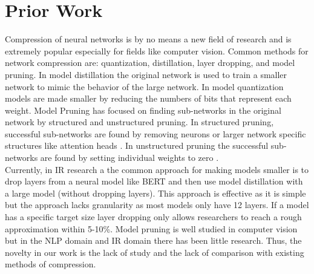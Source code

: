\documentclass[sigplan,screen]{acmart}
\begin{document}
\section{Prior Work}
Compression of neural networks is by no means a new field of research and is extremely popular especially for fields like computer vision. Common methods for network compression are: quantization, distillation, layer dropping, and model pruning. In model distillation \cite{Ba2014DoDN} the original network is used to train a smaller network to mimic the behavior of the large network. In model quantization \cite{Han2016DeepCC} models are made smaller by  reducing the numbers of bits that represent each weight. Model Pruning \cite{LeCun1989OptimalBD} has focused on finding sub-networks in the original network by structured and unstructured pruning. In structured pruning, successful sub-networks are found by removing neurons  \cite{Wang2019StructuredPF} or larger network specific structures like attention heads \cite{Voita2019AnalyzingMS}. In unstructured pruning the successful sub-networks are found by setting individual weights to zero \cite{Kwon2019StructuredCB}. \\
Currently, in IR research a the common approach for making models smaller is to drop layers from a neural model like BERT and then use model distillation with a large model (without dropping layers). This approach is effective as it is simple but the approach lacks granularity as most models only have 12 layers. If a model has a specific target size layer dropping only allows researchers to reach a rough approximation within 5-10\%. Model pruning is well studied in computer vision but in the NLP domain and IR domain there has been little research. Thus, the novelty in our work is the lack of study and the lack of comparison with existing methods of compression. 
\end{document}
